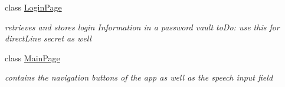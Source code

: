 \begin{DoxyCompactItemize}
class \hyperlink{class_listen_to_me_1_1_login_page}{Login\+Page}
\begin{DoxyCompactList}\small\item\em retrieves and stores login Information in a password vault to\+Do\+: use this for direct\+Line secret as well \end{DoxyCompactList}\item 
class \hyperlink{class_listen_to_me_1_1_main_page}{Main\+Page}
\begin{DoxyCompactList}\small\item\em contains the navigation buttons of the app as well as the speech input field \end{DoxyCompactList}\end{DoxyCompactItemize}
